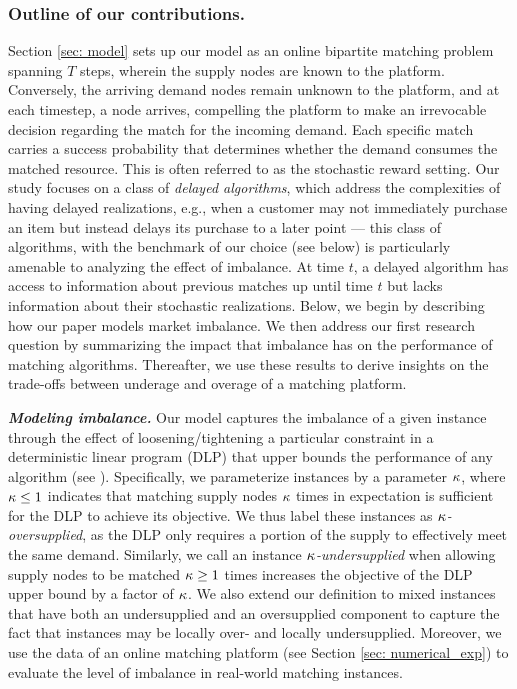 \subsubsection*{Outline of our contributions.}
\label{ssec: outline}
Section \ref{sec: model} sets up our model as an online bipartite matching problem spanning $T$ steps, wherein the supply nodes are known to the platform. Conversely, the arriving demand nodes remain unknown to the platform, and at each timestep, a node arrives, compelling the platform to make an irrevocable decision regarding the match for the incoming demand.
Each specific match carries a success probability that determines whether the demand consumes the matched resource. This is often referred to as the stochastic reward setting. Our study focuses on a class of \textit{delayed algorithms}, which address the complexities of having delayed realizations, e.g., when a customer may not immediately purchase an item but instead delays its purchase to a later point --- this class of algorithms, with the benchmark of our choice (see below) is particularly amenable to analyzing the effect of imbalance. At time $t$, a delayed algorithm has access to information about previous matches up until time $t$ but lacks information about their stochastic realizations. 
Below, we begin by describing how our paper models market imbalance. We then address our first research question by summarizing the impact that  imbalance has on the performance of matching algorithms. Thereafter, we use these results to derive insights on the trade-offs between underage and overage of a matching platform.

\emph{\textbf{Modeling imbalance.}} Our model captures the imbalance of a given instance through the effect of loosening/tightening a particular constraint in a deterministic linear program (DLP) that upper bounds the performance of any algorithm (see  ). 
Specifically, we parameterize instances by a parameter $\kappa$, where $\kappa\leq 1$ indicates that matching supply nodes $\kappa$ times in expectation is sufficient for the DLP to achieve its objective. We thus label these instances as \textit{$\kappa$-oversupplied}, as the DLP only requires a portion of the supply to effectively meet the same demand. Similarly, we call an instance \textit{$\kappa$-undersupplied}  when allowing supply nodes to be matched $\kappa\geq 1$ times increases the objective of the DLP upper bound by a factor of $\kappa$. We also extend our definition to mixed instances that have both an undersupplied and an oversupplied component to capture the fact that instances may be locally over- and locally undersupplied. Moreover, we use the data of an online matching platform (see Section \ref{sec: numerical_exp}) to evaluate the level of imbalance in real-world matching instances.



